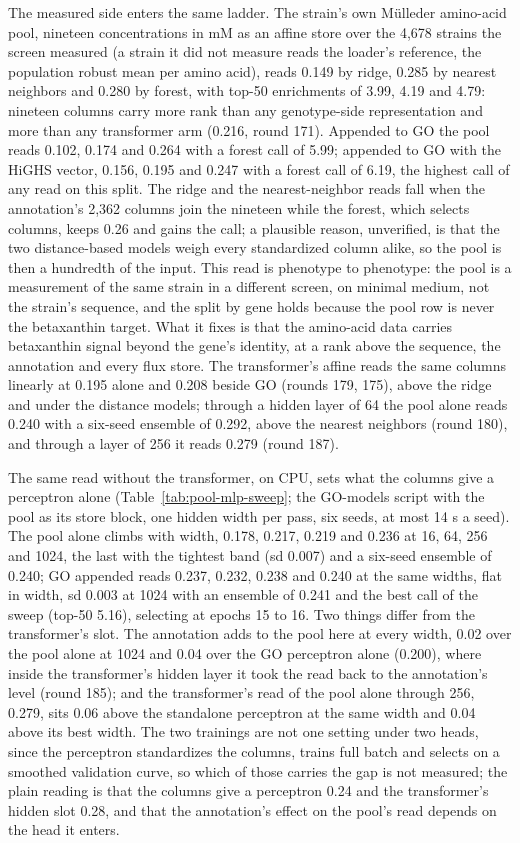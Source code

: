 The measured side enters the same ladder. The strain's own M\"ulleder amino-acid pool,
nineteen concentrations in mM as an affine store over the 4,678 strains the screen
measured (a strain it did not measure reads the loader's reference, the population
robust mean per amino acid), reads 0.149 by ridge, 0.285 by nearest neighbors and 0.280
by forest, with top-50 enrichments of 3.99, 4.19 and 4.79: nineteen columns carry more
rank than any genotype-side representation and more than any transformer arm (0.216,
round 171). Appended to GO the pool reads 0.102, 0.174 and 0.264 with a forest call of
5.99; appended to GO with the HiGHS vector, 0.156, 0.195 and 0.247 with a forest call
of 6.19, the highest call of any read on this split. The ridge and the nearest-neighbor
reads fall when the annotation's 2,362 columns join the nineteen while the forest,
which selects columns, keeps 0.26 and gains the call; a plausible reason, unverified,
is that the two distance-based models weigh every standardized column alike, so the
pool is then a hundredth of the input. This read is phenotype to phenotype: the pool is
a measurement of the same strain in a different screen, on minimal medium, not the
strain's sequence, and the split by gene holds because the pool row is never the
betaxanthin target. What it fixes is that the amino-acid data carries betaxanthin
signal beyond the gene's identity, at a rank above the sequence, the annotation and
every flux store. The transformer's affine reads the same columns linearly at 0.195
alone and 0.208 beside GO (rounds 179, 175), above the ridge and under the distance
models; through a hidden layer of 64 the pool alone reads 0.240 with a six-seed
ensemble of 0.292, above the nearest neighbors (round 180), and through a layer of 256
it reads 0.279 (round 187).

The same read without the transformer, on CPU, sets what the columns give a perceptron
alone (Table~\ref{tab:pool-mlp-sweep}; the GO-models script with the pool as its store
block, one hidden width per pass, six seeds, at most 14 s a seed). The pool alone
climbs with width, 0.178, 0.217, 0.219 and 0.236 at 16, 64, 256 and 1024, the last
with the tightest band (sd 0.007) and a six-seed ensemble of 0.240; GO appended reads
0.237, 0.232, 0.238 and 0.240 at the same widths, flat in width, sd 0.003 at 1024 with
an ensemble of 0.241 and the best call of the sweep (top-50 5.16), selecting at epochs
15 to 16. Two things differ from the transformer's slot. The annotation adds to the
pool here at every width, 0.02 over the pool alone at 1024 and 0.04 over the GO
perceptron alone (0.200), where inside the transformer's hidden layer it took the read
back to the annotation's level (round 185); and the transformer's read of the pool
alone through 256, 0.279, sits 0.06 above the standalone perceptron at the same width
and 0.04 above its best width. The two trainings are not one setting under two heads,
since the perceptron standardizes the columns, trains full batch and selects on a
smoothed validation curve, so which of those carries the gap is not measured; the
plain reading is that the columns give a perceptron 0.24 and the transformer's
hidden slot 0.28, and that the annotation's effect on the pool's read depends on the
head it enters.

